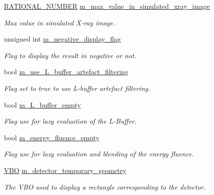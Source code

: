 \begin{DoxyCompactItemize}
\hyperlink{namespace_utilities_a40969b96bd8d847b962e297cb79f08ce}{RATIONAL\_\-NUMBER} \hyperlink{classg_virtual_x_ray_1_1_x_ray_renderer_a5e6f1a20a2356390150648719106d4bb}{m\_\-max\_\-value\_\-in\_\-simulated\_\-xray\_\-image}
\begin{DoxyCompactList}\small\item\em Max value in simulated X-\/ray image. \end{DoxyCompactList}\item 
unsigned int \hyperlink{classg_virtual_x_ray_1_1_x_ray_renderer_a8ae2b2b8eb0fe41316fcebcb7cfcd814}{m\_\-negative\_\-display\_\-flag}
\begin{DoxyCompactList}\small\item\em Flag to display the result in negative or not. \end{DoxyCompactList}\item 
bool \hyperlink{classg_virtual_x_ray_1_1_x_ray_renderer_ade779286f936cbe987f62796e2222916}{m\_\-use\_\-L\_\-buffer\_\-artefact\_\-filtering}
\begin{DoxyCompactList}\small\item\em Flag set to true to use L-\/buffer artefact filtering. \end{DoxyCompactList}\item 
bool \hyperlink{classg_virtual_x_ray_1_1_x_ray_renderer_aca5aa1801c0c56d9c2129d53a81aa2d1}{m\_\-L\_\-buffer\_\-empty}
\begin{DoxyCompactList}\small\item\em Flag use for lazy evaluation of the L-\/Buffer. \end{DoxyCompactList}\item 
bool \hyperlink{classg_virtual_x_ray_1_1_x_ray_renderer_aab1918fd34945b6afc1d1105e946001e}{m\_\-energy\_\-fluence\_\-empty}
\begin{DoxyCompactList}\small\item\em Flag use for lazy evaluation and blending of the energy fluence. \end{DoxyCompactList}\item 
\hyperlink{class_graphics_1_1_v_b_o}{VBO} \hyperlink{classg_virtual_x_ray_1_1_x_ray_renderer_ad17a5ac822d9095a14d361a41dd2827c}{m\_\-detector\_\-temporary\_\-geometry}
\begin{DoxyCompactList}\small\item\em The VBO used to display a rectangle corresponding to the detector. \end{DoxyCompactList}\end{DoxyCompactItemize}



